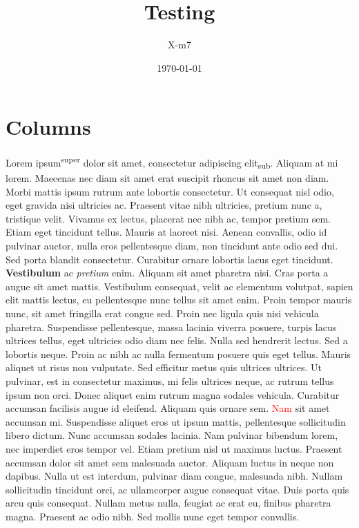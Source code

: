 \documentclass[a4paper]{article}
\title{Testing}
\author{X-m7}
\date{\today}
\begin{document}
    \maketitle
    \section{Columns}
    \begin{multicols}{5}
        \scriptsize
		Lorem ipsum\textsuperscript{super} dolor sit amet, consectetur adipiscing elit\textsubscript{sub}. Aliquam at mi lorem. Maecenas nec diam sit amet erat suscipit rhoncus sit amet non diam. Morbi mattis ipsum rutrum ante lobortis consectetur. Ut consequat nisl odio, eget gravida nisi ultricies ac. Praesent vitae nibh ultricies, pretium nunc a, tristique velit. Vivamus ex lectus, placerat nec nibh ac, tempor pretium sem. Etiam eget tincidunt tellus. Mauris at laoreet nisi. Aenean convallis, odio id pulvinar auctor, nulla eros pellentesque diam, non tincidunt ante odio sed dui. Sed porta blandit consectetur. Curabitur ornare lobortis lacus eget tincidunt.
        \textbf{Vestibulum} ac \textit{pretium} enim. Aliquam sit amet pharetra nisi. Cras porta a augue sit amet mattis. Vestibulum consequat, velit ac elementum volutpat, sapien elit mattis lectus, eu pellentesque nunc tellus sit amet enim. Proin tempor mauris nunc, sit amet fringilla erat congue sed. Proin nec ligula quis nisi vehicula pharetra. Suspendisse pellentesque, massa lacinia viverra posuere, turpis lacus ultrices tellus, eget ultricies odio diam nec felis. Nulla sed hendrerit lectus. Sed a lobortis neque. Proin ac nibh ac nulla fermentum posuere quis eget tellus. Mauris aliquet ut risus non vulputate. Sed efficitur metus quis ultrices ultrices. Ut pulvinar, est in consectetur maximus, mi felis ultrices neque, ac rutrum tellus ipsum non orci. Donec aliquet enim rutrum magna sodales vehicula. Curabitur accumsan facilisis augue id eleifend. Aliquam quis ornare sem.
        \textcolor{red}{Nam} sit amet accumsan mi. Suspendisse aliquet eros ut ipsum mattis, pellentesque sollicitudin libero dictum. Nunc accumsan sodales lacinia. Nam pulvinar bibendum lorem, nec imperdiet eros tempor vel. Etiam pretium nisl ut maximus luctus. Praesent accumsan dolor sit amet sem malesuada auctor. Aliquam luctus in neque non dapibus. Nulla ut est interdum, pulvinar diam congue, malesuada nibh. Nullam sollicitudin tincidunt orci, ac ullamcorper augue consequat vitae. Duis porta quis arcu quis consequat. Nullam metus nulla, feugiat ac erat eu, finibus pharetra magna. Praesent ac odio nibh. Sed mollis nunc eget tempor convallis.

\end{multicols}
\end{document}
